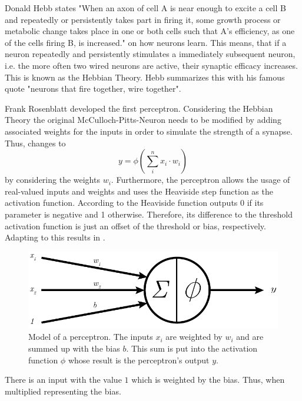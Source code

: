 Donald Hebb states "When an axon of cell A is near enough to excite a cell B and repeatedly or persistently takes part in firing it, some growth process or metabolic change takes place in one or both cells such that A's efficiency, as one of the cells firing B, is increased."\cite{Hebb1949} on how neurons learn.
This means, that if a neuron repeatedly and persistently stimulates a immediately subsequent neuron, i.e. the more often two wired neurons are active, their synaptic efficacy increases.
This is known as the Hebbian Theory.
Hebb summarizes this with his famous quote "neurons that fire together, wire together".

Frank Rosenblatt developed the first perceptron\cite{Rosenblatt58}.
Considering the Hebbian Theory the original McCulloch-Pitts-Neuron needs to be modified by adding associated weights for the inputs in order to simulate the strength of a synapse.
Thus,  changes to
\begin{equation}
	\label{eq:neuron}
	y = \phi \left( \sum_{i}^{n} x_i \cdot w_i \right)
\end{equation}
by considering the weights $w_i$.
Furthermore, the perceptron allows the usage of real-valued inputs and weights and uses the Heaviside step function as the activation function.
According to  the Heaviside function outputs 0 if its parameter is negative and 1 otherwise.
Therefore, its difference to the threshold activation function is just an offset of the threshold or bias, respectively.
Adapting  to this results in .
\begin{figure}
	\centering
	\includegraphics{images/perceptron}
	\caption[Model of a Perceptron]{Model of a perceptron. The inputs $x_i$ are weighted by $w_i$ and are summed up with the bias $b$. This sum is put into the activation function $\phi$ whose result is the perceptron's output $y$.}
	\label{fig:perceptron}
\end{figure}
There is an input with the value $1$ which is weighted by the bias.
Thus, when multiplied representing the bias.

